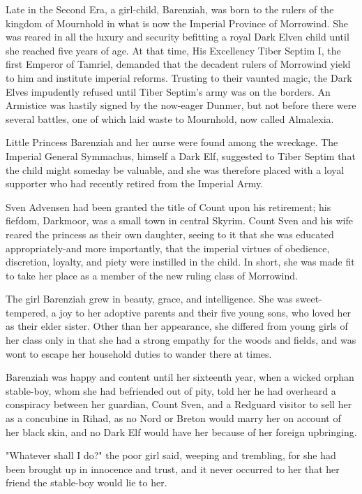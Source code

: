 
\dropcap Late in the Second Era, a girl-child, Barenziah, was born to the rulers of the kingdom of Mournhold in what is now the Imperial Province of Morrowind. She was reared in all the luxury and security befitting a royal Dark Elven child until she reached five years of age. At that time, His Excellency Tiber Septim I, the first Emperor of Tamriel, demanded that the decadent rulers of Morrowind yield to him and institute imperial reforms. Trusting to their vaunted magic, the Dark Elves impudently refused until Tiber Septim's army was on the borders. An Armistice was hastily signed by the now-eager Dunmer, but not before there were several battles, one of which laid waste to Mournhold, now called Almalexia.

Little Princess Barenziah and her nurse were found among the wreckage. The Imperial General Symmachus, himself a Dark Elf, suggested to Tiber Septim that the child might someday be valuable, and she was therefore placed with a loyal supporter who had recently retired from the Imperial Army.

Sven Advensen had been granted the title of Count upon his retirement; his fiefdom, Darkmoor, was a small town in central Skyrim. Count Sven and his wife reared the princess as their own daughter, seeing to it that she was educated appropriately-and more importantly, that the imperial virtues of obedience, discretion, loyalty, and piety were instilled in the child. In short, she was made fit to take her place as a member of the new ruling class of Morrowind.

The girl Barenziah grew in beauty, grace, and intelligence. She was sweet-tempered, a joy to her adoptive parents and their five young sons, who loved her as their elder sister. Other than her appearance, she differed from young girls of her class only in that she had a strong empathy for the woods and fields, and was wont to escape her household duties to wander there at times.

Barenziah was happy and content until her sixteenth year, when a wicked orphan stable-boy, whom she had befriended out of pity, told her he had overheard a conspiracy between her guardian, Count Sven, and a Redguard visitor to sell her as a concubine in Rihad, as no Nord or Breton would marry her on account of her black skin, and no Dark Elf would have her because of her foreign upbringing.

"Whatever shall I do?" the poor girl said, weeping and trembling, for she had been brought up in innocence and trust, and it never occurred to her that her friend the stable-boy would lie to her.


